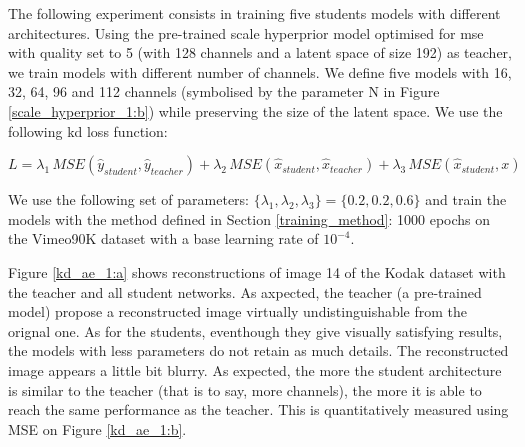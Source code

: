 The following experiment consists in training five students models with different architectures. Using the pre-trained scale hyperprior model optimised for \acrshort{mse} with \textsf{quality} set to 5 (with 128 channels and a latent space of size 192) as teacher, we train models with different number of channels. We define five models with 16, 32, 64, 96 and 112 channels (symbolised by the parameter N in Figure \ref{scale_hyperprior_1:b}) while preserving the size of the latent space. We use the following \acrshort{kd} loss function:

\begin{equation}
    L = \lambda_{1}\, MSE(\hat{y}_{student}, \hat{y}_{teacher}) + \lambda_{2}\, MSE(\hat{x}_{student}, \hat{x}_{teacher}) + \lambda_{3}\, MSE(\hat{x}_{student}, x)
    \label{loss_1}
\end{equation}

We use the following set of parameters: \(\{\lambda_{1}, \lambda_{2}, \lambda_{3}\} = \{0.2, 0.2, 0.6\}\) and train the models with the method defined in Section \ref{training_method}: 1000 epochs on the Vimeo90K dataset with a base learning rate of \(10^{-4}\).

Figure \ref{kd_ae_1:a} shows reconstructions of image 14 of the Kodak dataset with the teacher and all student networks. As axpected, the teacher (a pre-trained model) propose a reconstructed image virtually undistinguishable from the orignal one. As for the students, eventhough they give visually satisfying results, the models with less parameters do not retain as much details. The reconstructed image appears a little bit blurry. As expected, the more the student architecture is similar to the teacher (that is to say, more channels), the more it is able to reach the same performance as the teacher. This is quantitatively measured using MSE on Figure \ref{kd_ae_1:b}.

